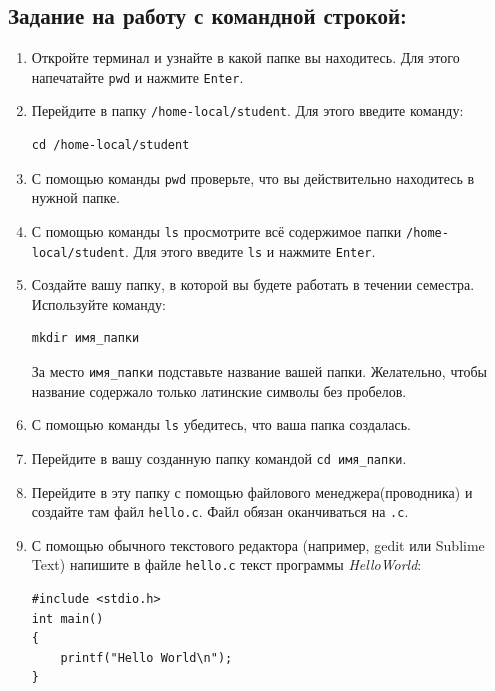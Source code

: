 \documentclass{article}
\begin{document}
\subsection*{Задание на работу с командной строкой:}
\begin{enumerate}
\item Откройте терминал и узнайте в какой папке вы находитесь. Для этого напечатайте \texttt{pwd} и нажмите \texttt{Enter}.
\item Перейдите в папку  \texttt{/home-local/student}. Для этого введите команду:
\begin{verbatim}
cd /home-local/student
\end{verbatim}
\item С помощью команды \texttt{pwd} проверьте, что вы действительно находитесь в нужной папке.
\item С помощью команды \texttt{ls} просмотрите всё содержимое папки \texttt{/home-local/student}. Для этого введите \texttt{ls} и нажмите \texttt{Enter}.
\item Создайте вашу папку, в которой вы будете работать в течении семестра. Используйте команду:
\begin{verbatim}
mkdir имя_папки
\end{verbatim}
За место \texttt{имя\_папки}  подставьте название вашей папки. Желательно, чтобы название содержало только латинские символы без пробелов.
\item С помощью команды \texttt{ls} убедитесь, что ваша папка создалась.
\item Перейдите в вашу созданную папку командой \texttt{cd имя\_папки}.

\item Перейдите в эту папку с помощью файлового менеджера(проводника) и создайте там файл \texttt{hello.c}. Файл обязан оканчиваться на \texttt{.c}.

\item С помощью обычного текстового редактора (например, gedit или Sublime Text) напишите в файле \texttt{hello.c} текст программы \textit{HelloWorld}:
\begin{lstlisting}
#include <stdio.h>
int main() 
{
    printf("Hello World\n");
}
\end{lstlisting}


\end{enumerate}
\end{document}

